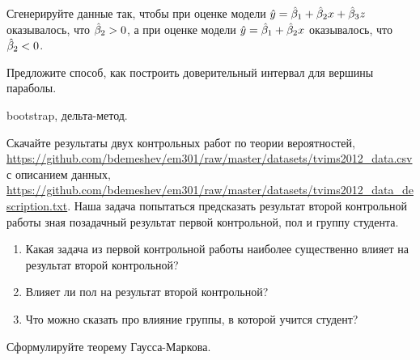 \begin{problem}
Сгенерируйте данные так, чтобы при оценке модели $\hat{y}=\hat{\beta}_1+\hat{\beta}_2x+\hat{\beta}_3z$ оказывалось, что $\hat{\beta}_2>0$, а при оценке модели $\hat{y}=\hat{\beta}_1+\hat{\beta}_2x$ оказывалось, что $\hat{\beta}_2<0$.


\begin{sol}
\end{sol}
\end{problem}



\begin{problem}
Предложите способ, как построить доверительный интервал для вершины параболы.


\begin{sol}
bootstrap, дельта-метод.
\end{sol}
\end{problem}



\begin{problem}
Скачайте результаты двух контрольных работ по теории вероятностей, \url{https://github.com/bdemeshev/em301/raw/master/datasets/tvims2012_data.csv} с описанием данных, \url{https://github.com/bdemeshev/em301/raw/master/datasets/tvims2012_data_description.txt}. Наша задача попытаться предсказать результат второй контрольной работы зная позадачный результат первой контрольной, пол и группу студента.
\begin{enumerate}
\item Какая задача из первой контрольной работы наиболее существенно влияет на результат второй контрольной?
\item Влияет ли пол на результат второй контрольной?
\item Что можно сказать про влияние группы, в которой учится студент?
\end{enumerate}


\begin{sol}
\end{sol}
\end{problem}


\begin{problem}
Сформулируйте теорему Гаусса-Маркова.
\begin{sol}
\end{sol}
\end{problem}



